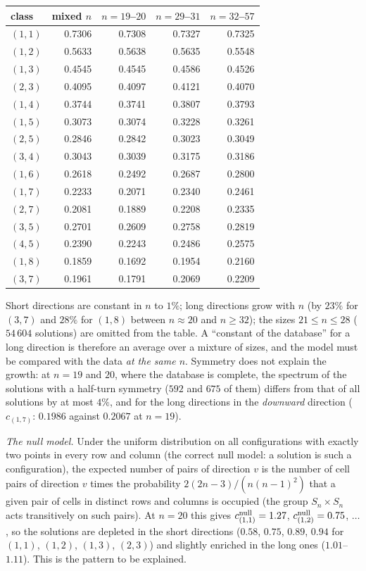 \documentclass[11pt,a4paper]{article}
\begin{document}
\begin{center}\begin{tabular}{lrrrr}\toprule
class & mixed $n$ & $n=19$--$20$ & $n=29$--$31$ & $n=32$--$57$\\\midrule
$(1,1)$ & 0.7306 & 0.7308 & 0.7327 & 0.7325\\
$(1,2)$ & 0.5633 & 0.5638 & 0.5635 & 0.5548\\
$(1,3)$ & 0.4545 & 0.4545 & 0.4586 & 0.4526\\
$(2,3)$ & 0.4095 & 0.4097 & 0.4121 & 0.4070\\
$(1,4)$ & 0.3744 & 0.3741 & 0.3807 & 0.3793\\
$(1,5)$ & 0.3073 & 0.3074 & 0.3228 & 0.3261\\
$(2,5)$ & 0.2846 & 0.2842 & 0.3023 & 0.3049\\
$(3,4)$ & 0.3043 & 0.3039 & 0.3175 & 0.3186\\
$(1,6)$ & 0.2618 & 0.2492 & 0.2687 & 0.2800\\
$(1,7)$ & 0.2233 & 0.2071 & 0.2340 & 0.2461\\
$(2,7)$ & 0.2081 & 0.1889 & 0.2208 & 0.2335\\
$(3,5)$ & 0.2701 & 0.2609 & 0.2758 & 0.2819\\
$(4,5)$ & 0.2390 & 0.2243 & 0.2486 & 0.2575\\
$(1,8)$ & 0.1859 & 0.1692 & 0.1954 & 0.2160\\
$(3,7)$ & 0.1961 & 0.1791 & 0.2069 & 0.2209\\
\end{tabular}\end{center}
Short directions are constant in $n$ to $1\%$; long directions grow with $n$ (by $23\%$ for $(3,7)$ and $28\%$ for
$(1,8)$ between $n\approx20$ and $n\ge32$); the sizes $21\le n\le28$ ($54\,604$ solutions) are omitted from the table.  A ``constant of the database'' for a long direction is therefore an average over a mixture
of sizes, and the model must be compared with the data \emph{at the same $n$}.  Symmetry does not explain the growth:
at $n=19$ and $20$, where the database is complete, the spectrum of the solutions with a half-turn symmetry
($592$ and $675$ of them) differs from that of all solutions by at most $4\%$, and for the long directions in the
\emph{downward} direction ($c_{(1,7)}$: $0.1986$ against $0.2067$ at $n=19$).

\emph{The null model.}  Under the uniform distribution on all configurations with exactly two points in every row
and column (the correct null model: a solution is such a configuration), the expected number of pairs of direction
$v$ is the number of cell pairs of direction $v$ times the probability $2(2n-3)/(n(n-1)^2)$ that a given pair of cells
in distinct rows and columns is occupied (the group $S_n\times S_n$ acts transitively on such pairs).  At $n=20$ this
gives $c^{\rm null}_{(1,1)}=1.27$, $c^{\rm null}_{(1,2)}=0.75$, $\dots$, so the solutions are depleted in the short
directions ($0.58$, $0.75$, $0.89$, $0.94$ for $(1,1)$, $(1,2)$, $(1,3)$, $(2,3)$) and slightly enriched in the long ones
($1.01$--$1.11$).  This is the pattern to be explained.
\end{document}
